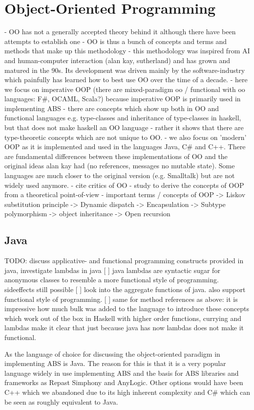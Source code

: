 \chapter{Object-Oriented Programming}
- OO has not a generally accepted theory behind it although there have been attempts to establish one \cite{abadi_theory_1996}
- OO is thus a bunch of concepts and terms and methods that make up this methodology - this methodology was inspired from AI and human-computer interaction (alan kay, sutherland) and has grown and matured in the 90s. Its development was driven mainly by the software-industry which painfully has learned how to best use OO over the time of a decade.
- here we focus on imperative OOP (there are mixed-paradigm oo / functional with oo languages: F\#, OCAML, Scala?) because imperative OOP is primarily used in implementing ABS
- there are concepts which show up both in OO and functional languages e.g. type-classes and inheritance of type-classes in haskell, but that does not make haskell an OO language - rather it shows that there are type-theoretic concepts which are not unique to OO.
- we also focus on 'modern' OOP as it is implemented and used in the languages Java, C\# and C++. There are fundamental differences between these implementations of OO and the original ideas alan kay had (no references, messages no mutable state). Some languages are much closer to the original version (e.g. Smalltalk) but are not widely used anymore.
- cite critics of OO
- study \cite{abadi_theory_1996} to derive the concepts of OOP from a theoretical point-of-view
- important terms / concepts of OOP
	-> Liskov substitution principle
	-> Dynamic dispatch
	-> Encapsulation
	-> Subtype polymorphism
	-> object inheritance 
	-> Open recursion
	
\section{Java}
TODO: discuss applicative- and functional programming constructs provided in java, investigate lambdas in java
[ ] java lambdas are syntactic sugar for anonymous classes to resemble a more functional style of programming. sideeffects still possible
[ ] look into the aggregate functions of java. also support functional style of programming.
[ ] same for method references as above: it is impressive how much bulk was added to the language to introduce these concepts which work out of the box in Haskell with higher order functions, currying and lambdas 
make it clear that just because java has now lambdas does not make it functional. 

As the language of choice for discussing the object-oriented paradigm in implementing ABS is Java. The reason for this is that it is a very popular language widely in use implementing ABS and the basis for ABS libraries and frameworks as Repast Simphony and AnyLogic. Other options would have been C++ which we abandoned due to its high inherent complexity and C\# which can be seen as roughly equivalent to Java.